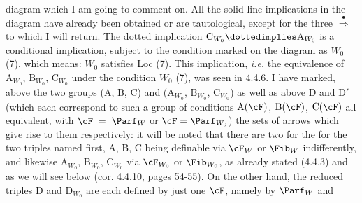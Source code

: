 diagram which I am going to comment on. All the solid-line implications in the diagram have already been obtained or are tautological, except for the three $\overset{\bullet}{\Longrightarrow}$ to which I will return. The dotted implication $\mathrm{C}_{W_0} \dottedimplies \mathrm{A}_{W_0}$ is a conditional implication, subject to the condition marked on the diagram as $W_0$ (7), which means: $W_0$ satisfies Loc (7). This implication, \textit{i.e.} the equivalence of $\mathrm{A}_{W_0}$, $\mathrm{B}_{W_0}$, $\mathrm{C}_{W_0}$ under the condition $W_0$ (7), was seen in 4.4.6. I have marked, above the two groups (A, B, C) and ($\mathrm{A}_{W_0}$, $\mathrm{B}_{W_0}$, $\mathrm{C}_{W_0}$) as well as above D and D$'$ (which each correspond to such a group of conditions $\mathrm{A}(\cF)$, $\mathrm{B}(\cF)$, $\mathrm{C}(\cF)$ all equivalent, with $\cF \;=\; \Parf_W$ or $\cF = \Parf_{W_0}$) the
sets of arrows which give rise to them respectively: it will be noted that there are two for the for the two triples named first, A, B, C being definable via $\cF_W$ or $\Fib_W$ indifferently, and likewise $\mathrm{A}_{W_0}$, $\mathrm{B}_{W_0}$, $\mathrm{C}_{W_0}$ via $\cF_{W_0}$ or $\Fib_{W_0}$, as already stated (4.4.3) and as we will see below (cor. 4.4.10, pages 54-55). On the other hand, the reduced triples D and $\mathrm{D}_{W_0}$ are each defined by just one $\cF$, namely by $\Parf_W$ and %